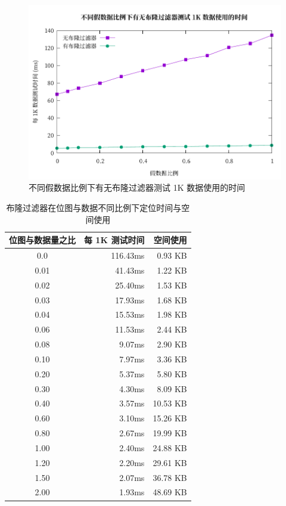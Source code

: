 \documentclass{mydoc}
\begin{document}
\begin{figure}[htbp]
  \centering
  \includegraphics{figure/benchmark-false-percent.pdf}
  \caption{不同假数据比例下有无布隆过滤器测试 1K 数据使用的时间}%
  \label{fig:false-percent}
\end{figure}

\begin{table}[htbp]
  \centering
  \caption{布隆过滤器在位图与数据不同比例下定位时间与空间使用}%
  \label{tab:bloom-test}

  \vspace{10pt}
  \begin{tabular}{crr}
    \toprule
    \textbf{位图与数据量之比} & \textbf{每 1K 测试时间} & \textbf{空间使用} \\
    \midrule
    0.0  & 116.43ms & 0.93 KB  \\
    0.01 & 41.43ms  & 1.22 KB  \\
    0.02 & 25.40ms  & 1.53 KB  \\
    0.03 & 17.93ms  & 1.68 KB  \\
    0.04 & 15.53ms  & 1.98 KB  \\
    0.06 & 11.53ms  & 2.44 KB  \\
    0.08 & 9.07ms   & 2.90 KB  \\
    0.10 & 7.97ms   & 3.36 KB  \\
    0.20 & 5.37ms   & 5.80 KB  \\
    0.30 & 4.30ms   & 8.09 KB  \\
    0.40 & 3.57ms   & 10.53 KB \\
    0.60 & 3.10ms   & 15.26 KB \\
    0.80 & 2.67ms   & 19.99 KB \\
    1.00 & 2.40ms   & 24.88 KB \\
    1.20 & 2.20ms   & 29.61 KB \\
    1.50 & 2.07ms   & 36.78 KB \\
    2.00 & 1.93ms   & 48.69 KB \\
    \bottomrule
  \end{tabular}
\end{table}
\end{document}

